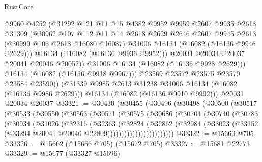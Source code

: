 \begin{lexlean}{RustCore}
\begin{coremodule}
                  @9960
                  @4252
                  (@31292
                    @121
                    @11
                    @15
                    @4382
                    @9952
                    @9959
                    @2607
                    @9935
                    @2613
                    @31309
                    (@30962
                      @107
                      @112
                      @11
                      @14
                      @2618
                      @2629
                      @2646
                      @2607
                      @9945
                      @2613
                      (@30999 @106 @2618 @16080 @16087)
                      @31006
                      @16134
                      (@16082 (@16136 @9946 @2629)))
                    @16134
                    (@16082 (@16136 @9936 @9952)))
                  @20031
                  @20034
                  @20037
                  @20041
                  @20046
                  @20052))
              @31006
              @16134
              (@16082 (@16136 @9928 @2629)))
            @16134
            (@16082 (@16136 @9918 @9967)))
          @23569
          @23572
          @23575
          @23579
          @23584
          @23590))
      (@31339 @9985 @2613 @31238 @31006 @16134 (@16082 (@16136 @9986 @2629)))
      @16134
      (@16082 (@16136 @9910 @9992)))
    @20031
    @20034
    @20037
@33321 := @30430
    (@30455
      (@30496
        (@30498
          (@30500
            (@30517
              (@30533
                (@30550
                  (@30563
                    (@30571
                      (@30575
                        (@30686
                          (@30704
                            (@30740
                              (@30783
                                (@30934
                                  (@31026
                                    (@32316
                                      (@32363
                                        (@32824
                                          (@32862
                                            (@32984
                                              (@33023
                                                (@33152
                                                  (@33294
                                                    @20041
                                                    @20046
                                                    @22809))))))))))))))))))))))))
@33322 := @15660 @705
@33326 := @15662 (@15666 @705) (@15672 @705)
@33327 := @15681 @22773
@33329 := @15677 (@33327 @15696)

\end{coremodule}
\end{lexlean}
